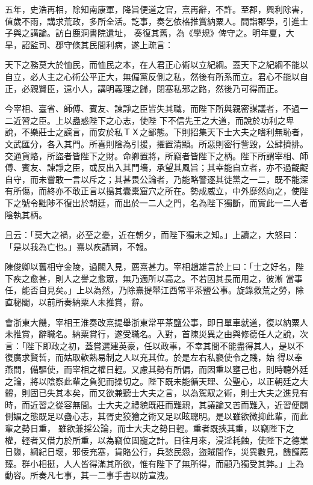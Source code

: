\begin{pinyinscope}
 五年，史浩再相，除知南康軍，降旨便道之官，熹再辭，不許。至郡，興利除害，值歲不雨，講求荒政，多所全活。訖事，奏乞依格推賞納粟人。間詣郡學，引進士子與之講論。訪白鹿洞書院遺址，
 奏復其舊，為《學規》俾守之。明年夏，大旱，詔監司、郡守條其民間利病，遂上疏言：



 天下之務莫大於恤民，而恤民之本，在人君正心術以立紀綱。蓋天下之紀綱不能以自立，必人主之心術公平正大，無偏黨反側之私，然後有所系而立。君心不能以自正，必親賢臣，遠小人，講明義理之歸，閉塞私邪之路，然後乃可得而正。



 今宰相、臺省、師傅、賓友、諫諍之臣皆失其職，而陛下所與親密謀議者，不過一二近習之臣。上以蠱惑陛下之心志，使陛
 下不信先王之大道，而說於功利之卑說，不樂莊士之讜言，而安於私ＴＸ之鄙態。下則招集天下士大夫之嗜利無恥者，文武匯分，各入其門。所喜則陰為引援，擢置清顯。所惡則密行訾毀，公肆擠排。交通貨賂，所盜者皆陛下之財。命卿置將，所竊者皆陛下之柄。陛下所謂宰相、師傅、賓友、諫諍之臣，或反出入其門墻，承望其風旨；其幸能自立者，亦不過齪齪自守，而未嘗敢一言以斥之；其甚畏公論者，乃能略警逐其徒黨之一二，既不能深
 有所傷，而終亦不敢正言以搗其囊橐窟穴之所在。勢成威立，中外靡然向之，使陛下之號令黜陟不復出於朝廷，而出於一二人之門，名為陛下獨斷，而實此一二人者陰執其柄。



 且云：「莫大之禍，必至之憂，近在朝夕，而陛下獨未之知。」上讀之，大怒曰：「是以我為亡也。」熹以疾請祠，不報。



 陳俊卿以舊相守金陵，過闕入見，薦熹甚力。宰相趙雄言於上曰：「士之好名，陛下疾之愈甚，則人之譽之愈眾，無乃適所以高之。不若因其長而用之，彼漸
 當事任，能否自見矣。」上以為然，乃除熹提舉江西常平茶鹽公事。旋錄救荒之勞，除直秘閣，以前所奏納粟人未推賞，辭。



 會浙東大饑，宰相王淮奏改熹提舉浙東常平茶鹽公事，即日單車就道，復以納粟人未推賞，辭職名。納粟賞行，遂受職名。入對，首陳災異之由與修德任人之說，次言：「陛下即政之初，蓋嘗選建英豪，任以政事，不幸其間不能盡得其人，是以不復廣求賢哲，而姑取軟熟易制之人以充其位。於是左右私褻使令之賤，始
 得以奉燕間，備驅使，而宰相之權日輕。又慮其勢有所偏，而因重以壅己也，則時聽外廷之論，將以陰察此輩之負犯而操切之。陛下既未能循天理、公聖心，以正朝廷之大體，則固已失其本矣，而又欲兼聽士大夫之言，以為駕馭之術，則士大夫之進見有時，而近習之從容無間。士大夫之禮貌既莊而難親，其議論又苦而難入，近習便闢側媚之態既足以蠱心志，其胥史狡獪之術又足以眩聰明。是以雖欲微抑此輩，而此輩之勢日重，
 雖欲兼採公論，而士大夫之勢日輕。重者既挾其重，以竊陛下之權，輕者又借力於所重，以為竊位固寵之計。日往月來，浸淫耗蝕，使陛下之德業日隳，綱紀日壞，邪佞充塞，貨賂公行，兵愁民怨，盜賊間作，災異數見，饑饉薦臻。群小相挺，人人皆得滿其所欲，惟有陛下了無所得，而顧乃獨受其弊。」上為動容。所奏凡七事，其一二事手書以防宣洩。




\end{pinyinscope}
